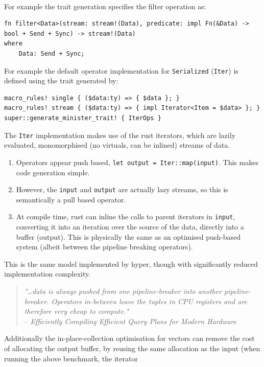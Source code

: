 \\ For example the trait generation specifies the filter operation as:
\begin{verbatim}
fn filter<Data>(stream: stream!(Data), predicate: impl Fn(&Data) -> bool + Send + Sync) -> stream!(Data)
where
    Data: Send + Sync; 
\end{verbatim}
For example the default operator implementation for \texttt{Serialized} (\texttt{Iter}) is defined using the trait generated by:
\begin{verbatim}
macro_rules! single { ($data:ty) => { $data }; }
macro_rules! stream { ($data:ty) => { impl Iterator<Item = $data> }; }
super::generate_minister_trait! { IterOps }
\end{verbatim}
The \texttt{Iter} implementation makes use of the rust iterators, which are lazily evaluated, monomorphised (no virtuals, can be inlined) streams of data.
\begin{enumerate}
    \setlength\itemsep{0em}
    \item Operators appear push based, \texttt{let output = Iter::map(input)}. This makes code generation simple.
    \item However, the \texttt{input} and \texttt{output} are actually lazy streams, so this is semantically a pull based operator.
    \item At compile time, rust can inline the calls to parent iterators in \texttt{input}, converting it into an iteration over the source of the data, directly into a buffer (output). This is physically the same as an optimised push-based system (albeit between the pipeline breaking operators).
\end{enumerate}
This is the same model implemented by hyper\cite{HyperQueryPlan}, though with significantly reduced implementation complexity.
\begin{quote}
    \textit{"\dots data is always pushed from one pipeline-breaker into another
        pipeline-breaker. Operators in-between leave the tuples in
        CPU registers and are therefore very cheap to compute."}
    \\ \vspace{0.5cm}
    \hfill -- \textit{Efficiently Compiling Efficient Query Plans
        for Modern Hardware\cite{HyperQueryPlan}}
\end{quote}
Additionally the in-place-collection optimisation for vectors\cite{RustInPlaceCollect} can remove the cost of allocating 
the output buffer, by reusing the same allocation as the input (when running the above benchmark, the iterator 
